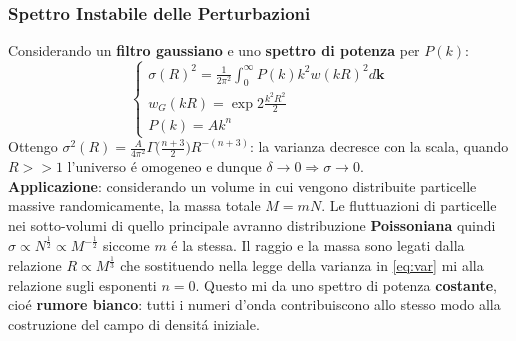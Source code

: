 \documentclass[12pt, a4paper]{article}
\begin{document}
\subsubsection{Spettro Instabile delle Perturbazioni}
Considerando un \textbf{filtro gaussiano} e uno \textbf{spettro di potenza} per $P(k)$:
\begin{equation}
\begin{cases}
\sigma(R)^2= \frac{1}{2\pi^2}\int_0^{\infty} P(k) k^2 w(kR)^2  d\textbf{k}
\\
w_G(kR)=\exp{2\frac{k^2R^2}{2}}
\\
P(k)= Ak^n
\end{cases}
\label{eq:var}
\end{equation}
Ottengo $\sigma^2(R)=\frac{A}{4\pi^2}\Gamma\big(\frac{n+3}{2}\big)R^{-(n+3)}$: la varianza decresce con la scala, quando $R>>1$ l'universo \'{e} omogeneo e dunque $\delta\rightarrow 0 \Rightarrow \sigma\rightarrow 0$.\\
\textbf{Applicazione}: considerando un volume in cui vengono distribuite particelle massive randomicamente, la massa totale $M=mN$. Le fluttuazioni di particelle nei sotto-volumi di quello principale avranno distribuzione \textbf{Poissoniana} quindi $\sigma\propto N^{\frac{1}{2}}\propto M^{-\frac{1}{2}}$ siccome $m$ \'{e} la stessa. Il raggio e la massa sono legati dalla relazione $R\propto M^{\frac{1}{3}}$ che sostituendo nella legge della varianza in \ref{eq:var} mi  alla relazione sugli esponenti $n=0$. Questo mi da uno spettro di potenza \textbf{costante}, cio\'{e} \textbf{rumore bianco}: tutti i numeri d'onda contribuiscono allo stesso modo alla costruzione del campo di densit\'{a} iniziale.
\end{document}
